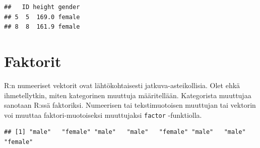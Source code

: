 \documentclass[
]{book}
\newenvironment{Shaded}{\begin{snugshade}}{\end{snugshade}}
\newcommand{\CommentTok}[1]{\textcolor[rgb]{0.56,0.35,0.01}{\textit{#1}}}
\newcommand{\DecValTok}[1]{\textcolor[rgb]{0.00,0.00,0.81}{#1}}
\newcommand{\FunctionTok}[1]{\textcolor[rgb]{0.00,0.00,0.00}{#1}}
\newcommand{\NormalTok}[1]{#1}
\newcommand{\OtherTok}[1]{\textcolor[rgb]{0.56,0.35,0.01}{#1}}
\newcommand{\SpecialCharTok}[1]{\textcolor[rgb]{0.00,0.00,0.00}{#1}}
\newcommand{\StringTok}[1]{\textcolor[rgb]{0.31,0.60,0.02}{#1}}
\begin{document}
\begin{Shaded}
\end{Shaded}

\begin{verbatim}
##   ID height gender
## 5  5  169.0 female
## 8  8  161.9 female
\end{verbatim}

\hypertarget{faktorit}{%
\section{Faktorit}\label{faktorit}}

R:n numeeriset vektorit ovat lähtökohtaisesti jatkuva-asteikollisia. Olet ehkä ihmetellytkin, miten kategorinen muuttuja määritellään. Kategorista muuttujaa sanotaan R:ssä faktoriksi. Numeerisen tai tekstimuotoisen muuttujan tai vektorin voi muuttaa faktori-muotoiseksi muuttujaksi \texttt{factor} -funktiolla.

\begin{Shaded}
\end{Shaded}

\begin{verbatim}
## [1] "male"   "female" "male"   "male"   "female" "male"   "male"   "female"
\end{verbatim}

\begin{Shaded}
\end{Shaded}
\end{document}
